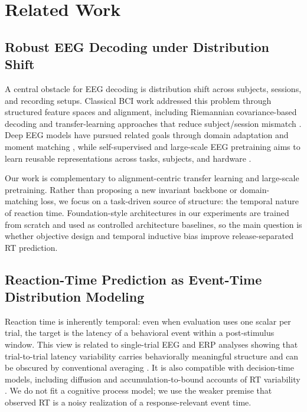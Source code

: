 \documentclass[12pt]{article}
\begin{document}
\section{Related Work}

\subsection{Robust EEG Decoding under Distribution Shift}
A central obstacle for EEG decoding is distribution shift across subjects, sessions, and recording setups. Classical BCI work addressed this problem through structured feature spaces and alignment, including Riemannian covariance-based decoding and transfer-learning approaches that reduce subject/session mismatch \citep{Barachant2012RiemannianBCI,Jayaram2016TransferLearningBCI,Zanini2018RiemannianTL,HeWu2020EuclideanAlignment}. Deep EEG models have pursued related goals through domain adaptation and moment matching \citep{Ganin2016DANN,SunSaenko2016DeepCORAL}, while self-supervised and large-scale EEG pretraining aims to learn reusable representations across tasks, subjects, and hardware \citep{Kostas2021BENDR,wang2024eegpt,Jiang2024LaBraM,Chen2024EEGFormer,Wang2025EEGMamba,ElOuahidi2025REVE,Yue2024BrainGPT}.

Our work is complementary to alignment-centric transfer learning and large-scale pretraining. Rather than proposing a new invariant backbone or domain-matching loss, we focus on a task-driven source of structure: the temporal nature of reaction time. Foundation-style architectures in our experiments are trained from scratch and used as controlled architecture baselines, so the main question is whether objective design and temporal inductive bias improve release-separated RT prediction.

\subsection{Reaction-Time Prediction as Event-Time Distribution Modeling}
Reaction time is inherently temporal: even when evaluation uses one scalar per trial, the target is the latency of a behavioral event within a post-stimulus window. This view is related to single-trial EEG and ERP analyses showing that trial-to-trial latency variability carries behaviorally meaningful structure and can be obscured by conventional averaging \citep{Jung1998SingleTrialERP,Ouyang2017LatencyReview}. It is also compatible with decision-time models, including diffusion and accumulation-to-bound accounts of RT variability \citep{Ratcliff2008Diffusion,OConnell2012Supramodal,Kelly2013Internal}. We do not fit a cognitive process model; we use the weaker premise that observed RT is a noisy realization of a response-relevant event time.
\end{document}
